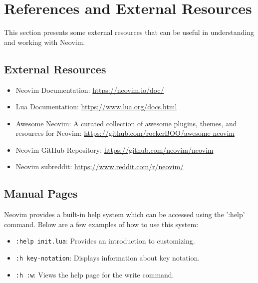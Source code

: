 \documentclass{article}
\begin{document}
\section{References and External Resources}\label{sec:references}

This section presents some external resources that can be useful in 
understanding and working with Neovim.

\subsection{External Resources}

\begin{itemize}
\item Neovim Documentation: \href{https://neovim.io/doc/}{https://neovim.io/doc/}
\item Lua Documentation: \href{https://www.lua.org/docs.html}{https://www.lua.org/docs.html}
\item Awesome Neovim: A curated collection of awesome plugins, themes, and resources for Neovim: \href{https://github.com/rockerBOO/awesome-neovim}{https://github.com/rockerBOO/awesome-neovim}
\item Neovim GitHub Repository: \href{https://github.com/neovim/neovim}{https://github.com/neovim/neovim}
\item Neovim subreddit: \href{https://www.reddit.com/r/neovim/}{https://www.reddit.com/r/neovim/}
\end{itemize}

\subsection{Manual Pages}

Neovim provides a built-in help system which can be accessed using the ':help' 
command. Below are a few examples of how to use this system:

\begin{itemize}
\item \verb|:help init.lua|: Provides an introduction to customizing.
\item \verb|:h key-notation|: Displays information about key notation.
\item \verb|:h :w|: Views the help page for the write command.
\end{itemize}
\end{document}
